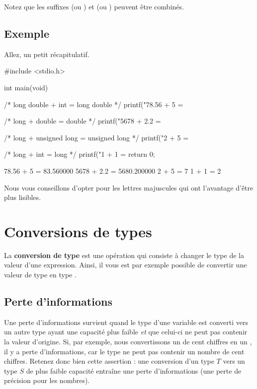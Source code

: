 \begin{infobox}
Notez que les suffixes  (ou ) et  (ou ) peuvent être combinés.
\end{infobox}

  
\subsection{Exemple}
\label{exemple}

Allez, un petit récapitulatif.

\begin{C}
#include <stdio.h>


int main(void)
{
    /* long double + int = long double */
    printf("78.56 + 5 = %

    /* long + double = double */
    printf("5678 + 2.2 = %

    /* long + unsigned long = unsigned long */
    printf("2 + 5 = %

    /* long + int = long */
    printf("1 + 1 = %
    return 0;
}
\end{C}

\begin{C}
78.56 + 5 = 83.560000
5678 + 2.2 = 5680.200000
2 + 5 = 7
1 + 1 = 2
\end{C}

\begin{infobox}
Nous vous conseillons d'opter pour
les lettres majuscules qui ont l'avantage d'être plus lisibles.
\end{infobox}

\section{Conversions de types}
\label{conversions-de-types}

La \textbf{conversion de type} est une opération qui consiste à changer
le type de la valeur d'une expression. Ainsi, il vous est par exemple
possible de convertir une valeur de type  en type
.

\subsection{Perte d'informations}
\label{perte-dinformations}

Une perte d'informations survient quand le type d'une variable est
converti vers un autre type ayant une capacité plus faible \emph{et} que
celui-ci ne peut pas contenir la valeur d'origine. Si, par exemple, nous
convertissons un  de cent chiffres en un , il
y a perte d'informations, car le type  ne peut pas contenir
un nombre de cent chiffres. Retenez donc bien cette assertion : une
conversion d'un type \(T\) vers un type \(S\) de plus faible capacité
entraîne une perte d'informations (une perte de précision pour les
nombres).

